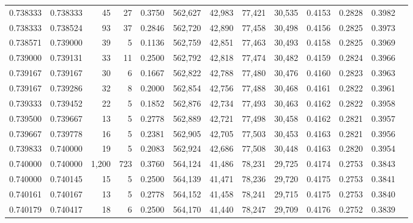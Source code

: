 \begin{tabular}{rrrrrrrrrrrrr}
0.738333 & 0.738333 &    45 &  27 &                                     0.3750 & 562,627 &  42,983 &  77,421 &  30,535 & 0.4153 & 0.2828 & 0.3982 \\
0.738333 & 0.738524 &    93 &  37 &                                     0.2846 & 562,720 &  42,890 &  77,458 &  30,498 & 0.4156 & 0.2825 & 0.3973 \\
0.738571 & 0.739000 &    39 &   5 &                                     0.1136 & 562,759 &  42,851 &  77,463 &  30,493 & 0.4158 & 0.2825 & 0.3969 \\
0.739000 & 0.739131 &    33 &  11 &                                     0.2500 & 562,792 &  42,818 &  77,474 &  30,482 & 0.4159 & 0.2824 & 0.3966 \\
0.739167 & 0.739167 &    30 &   6 &                                     0.1667 & 562,822 &  42,788 &  77,480 &  30,476 & 0.4160 & 0.2823 & 0.3963 \\
0.739167 & 0.739286 &    32 &   8 &                                     0.2000 & 562,854 &  42,756 &  77,488 &  30,468 & 0.4161 & 0.2822 & 0.3961 \\
0.739333 & 0.739452 &    22 &   5 &                                     0.1852 & 562,876 &  42,734 &  77,493 &  30,463 & 0.4162 & 0.2822 & 0.3958 \\
0.739500 & 0.739667 &    13 &   5 &                                     0.2778 & 562,889 &  42,721 &  77,498 &  30,458 & 0.4162 & 0.2821 & 0.3957 \\
0.739667 & 0.739778 &    16 &   5 &                                     0.2381 & 562,905 &  42,705 &  77,503 &  30,453 & 0.4163 & 0.2821 & 0.3956 \\
0.739833 & 0.740000 &    19 &   5 &                                     0.2083 & 562,924 &  42,686 &  77,508 &  30,448 & 0.4163 & 0.2820 & 0.3954 \\
0.740000 & 0.740000 & 1,200 & 723 &                                     0.3760 & 564,124 &  41,486 &  78,231 &  29,725 & 0.4174 & 0.2753 & 0.3843 \\
0.740000 & 0.740145 &    15 &   5 &                                     0.2500 & 564,139 &  41,471 &  78,236 &  29,720 & 0.4175 & 0.2753 & 0.3841 \\
0.740161 & 0.740167 &    13 &   5 &                                     0.2778 & 564,152 &  41,458 &  78,241 &  29,715 & 0.4175 & 0.2753 & 0.3840 \\
0.740179 & 0.740417 &    18 &   6 &                                     0.2500 & 564,170 &  41,440 &  78,247 &  29,709 & 0.4176 & 0.2752 & 0.3839 \\

\end{tabular}
